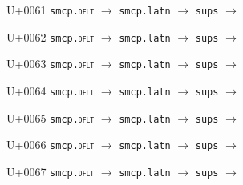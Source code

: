 \documentclass{article}
\begin{document}
\begin{substitutions}
\goodbreak

U+0061  \linebreak
    \texttt{smcp.\textsc{dflt}} $\to$  \linebreak
    \texttt{smcp.latn} $\to$  \linebreak
    \texttt{sups} $\to$  

\goodbreak

U+0062  \linebreak
    \texttt{smcp.\textsc{dflt}} $\to$  \linebreak
    \texttt{smcp.latn} $\to$  \linebreak
    \texttt{sups} $\to$  

\goodbreak

U+0063  \linebreak
    \texttt{smcp.\textsc{dflt}} $\to$  \linebreak
    \texttt{smcp.latn} $\to$  \linebreak
    \texttt{sups} $\to$  

\goodbreak

U+0064  \linebreak
    \texttt{smcp.\textsc{dflt}} $\to$  \linebreak
    \texttt{smcp.latn} $\to$  \linebreak
    \texttt{sups} $\to$  

\goodbreak

U+0065  \linebreak
    \texttt{smcp.\textsc{dflt}} $\to$  \linebreak
    \texttt{smcp.latn} $\to$  \linebreak
    \texttt{sups} $\to$  

\goodbreak

U+0066  \linebreak
    \texttt{smcp.\textsc{dflt}} $\to$  \linebreak
    \texttt{smcp.latn} $\to$  \linebreak
    \texttt{sups} $\to$  

\goodbreak

U+0067  \linebreak
    \texttt{smcp.\textsc{dflt}} $\to$  \linebreak
    \texttt{smcp.latn} $\to$  \linebreak
    \texttt{sups} $\to$  


\end{substitutions}
\end{document}
